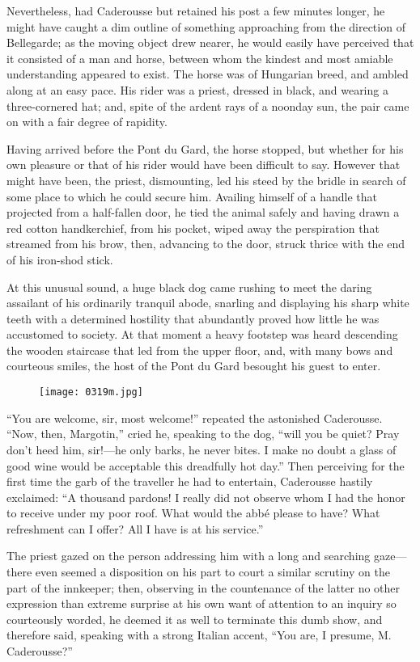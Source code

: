 Nevertheless, had Caderousse but retained his post a few minutes
longer, he might have caught a dim outline of something approaching
from the direction of Bellegarde; as the moving object drew nearer, he
would easily have perceived that it consisted of a man and horse,
between whom the kindest and most amiable understanding appeared to
exist. The horse was of Hungarian breed, and ambled along at an easy
pace. His rider was a priest, dressed in black, and wearing a
three-cornered hat; and, spite of the ardent rays of a noonday sun, the
pair came on with a fair degree of rapidity.

Having arrived before the Pont du Gard, the horse stopped, but whether
for his own pleasure or that of his rider would have been difficult to
say. However that might have been, the priest, dismounting, led his
steed by the bridle in search of some place to which he could secure
him. Availing himself of a handle that projected from a half-fallen
door, he tied the animal safely and having drawn a red cotton
handkerchief, from his pocket, wiped away the perspiration that
streamed from his brow, then, advancing to the door, struck thrice with
the end of his iron-shod stick.

At this unusual sound, a huge black dog came rushing to meet the daring
assailant of his ordinarily tranquil abode, snarling and displaying his
sharp white teeth with a determined hostility that abundantly proved
how little he was accustomed to society. At that moment a heavy
footstep was heard descending the wooden staircase that led from the
upper floor, and, with many bows and courteous smiles, the host of the
Pont du Gard besought his guest to enter.

\begin{figure}[h]
\texttt{[image: 0319m.jpg]}
\end{figure}

“You are welcome, sir, most welcome!” repeated the astonished
Caderousse. “Now, then, Margotin,” cried he, speaking to the dog, “will
you be quiet? Pray don’t heed him, sir!—he only barks, he never bites.
I make no doubt a glass of good wine would be acceptable this
dreadfully hot day.” Then perceiving for the first time the garb of the
traveller he had to entertain, Caderousse hastily exclaimed: “A
thousand pardons! I really did not observe whom I had the honor to
receive under my poor roof. What would the abbé please to have? What
refreshment can I offer? All I have is at his service.”

The priest gazed on the person addressing him with a long and searching
gaze—there even seemed a disposition on his part to court a similar
scrutiny on the part of the innkeeper; then, observing in the
countenance of the latter no other expression than extreme surprise at
his own want of attention to an inquiry so courteously worded, he
deemed it as well to terminate this dumb show, and therefore said,
speaking with a strong Italian accent, “You are, I presume, M.
Caderousse?”

